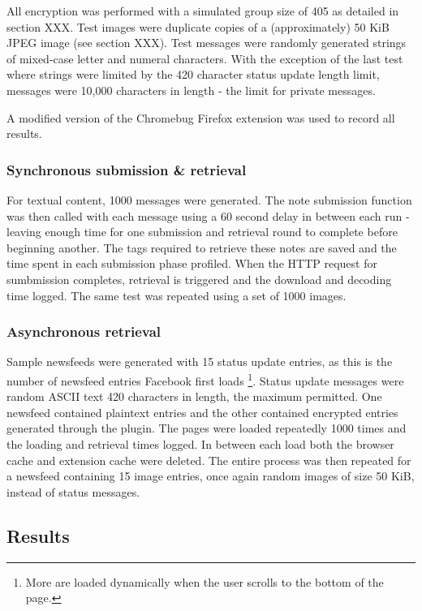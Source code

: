 All encryption was performed with a simulated group size of 405 as detailed in section XXX. Test images were duplicate copies of a (approximately) 50 KiB JPEG image (see section XXX). Test messages were randomly generated strings of mixed-case letter and numeral characters. With the exception of the last test where strings were limited by the 420 character status update length limit, messages were 10,000 characters in length - the limit for private messages.

A modified version of the Chromebug Firefox extension was used to record all results.

\subsubsection{Synchronous submission \& retrieval}

For textual content, 1000 messages were generated. The note submission function was then called with each message using a 60 second delay in between each run - leaving enough time for one submission and retrieval round to complete before beginning another. The tags required to retrieve these notes are saved and the time spent in each submission phase profiled. When the HTTP request for sumbmission completes, retrieval is triggered and the download and decoding time logged. The same test was repeated using a set of 1000 images.

\subsubsection{Asynchronous retrieval}

Sample newsfeeds were generated with 15 status update entries, as this is the number of newsfeed entries Facebook first loads \footnote{More are loaded dynamically when the user scrolls to the bottom of the page.}. Status update messages were random ASCII text 420 characters in length, the maximum permitted. One newsfeed contained plaintext entries and the other contained encrypted entries generated through the plugin. The pages were loaded repeatedly 1000 times and the loading and retrieval times logged. In between each load both the browser cache and extension cache were deleted. The entire process was then repeated for a newsfeed containing 15 image entries, once again random images of size 50 KiB, instead of status messages.

\subsection{Results}


